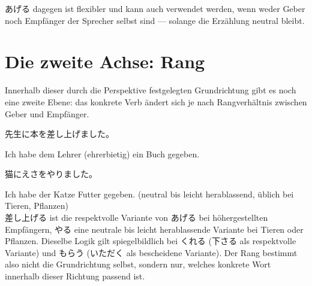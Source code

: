 \documentclass[12pt]{book}
\begin{document}
あげる dagegen ist flexibler und kann auch verwendet werden, wenn weder Geber noch Empfänger der Sprecher selbst sind — solange die Erzählung neutral bleibt.

\section*{Die zweite Achse: Rang}

Innerhalb dieser durch die Perspektive festgelegten Grundrichtung gibt es noch eine zweite Ebene: das konkrete Verb ändert sich je nach Rangverhältnis zwischen Geber und Empfänger.

\par\quad 先生に本を差し上げました。\\
\par\quad Ich habe dem Lehrer (ehrerbietig) ein Buch gegeben.\\

\par\quad 猫にえさをやりました。\\
\par\quad Ich habe der Katze Futter gegeben. (neutral bis leicht herablassend, üblich bei Tieren, Pflanzen)\\

差し上げる ist die respektvolle Variante von あげる bei höhergestellten Empfängern, やる eine neutrale bis leicht herablassende Variante bei Tieren oder Pflanzen. Dieselbe Logik gilt spiegelbildlich bei くれる (下さる als respektvolle Variante) und もらう (いただく als bescheidene Variante). Der Rang bestimmt also nicht die Grundrichtung selbst, sondern nur, welches konkrete Wort innerhalb dieser Richtung passend ist.
\end{document}
